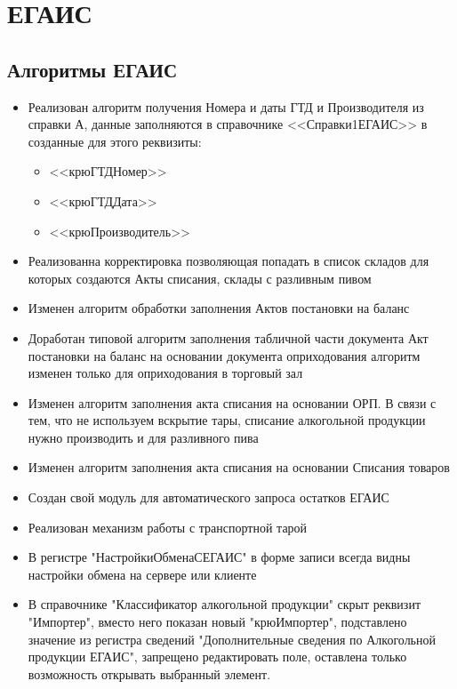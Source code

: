 \section{ЕГАИС}
\subsection{Алгоритмы ЕГАИС}


\begin{itemize}
	\item Реализован алгоритм получения Номера и даты ГТД и Производителя из справки А, данные заполняются в справочнике <<Справки1ЕГАИС>> в созданные для этого реквизиты:
    \begin{itemize}
        \item <<крюГТДНомер>>
        \item <<крюГТДДата>>
        \item <<крюПроизводитель>>
    \end{itemize}
	\item Реализованна корректировка позволяющая попадать в список складов для которых создаются Акты списания, склады с разливным пивом
	\item Изменен алгоритм обработки заполнения Актов постановки на баланс
	\item Доработан типовой алгоритм заполнения табличной части документа Акт постановки на баланс на 	основании документа оприходования алгоритм изменен только для оприходования в торговый зал
	\item Изменен алгоритм заполнения акта списания на основании ОРП. В связи с тем, что не используем вскрытие тары, списание алкогольной продукции  нужно производить и для разливного пива

	\item Изменен алгоритм заполнения акта списания на основании Списания товаров
	\item Создан свой модуль для автоматического запроса остатков ЕГАИС
	\item Реализован механизм работы с транспортной тарой
	\item В регистре "НастройкиОбменаСЕГАИС" в форме записи всегда видны настройки обмена на сервере или клиенте
	\item В справочнике "Классификатор алкогольной продукции" скрыт реквизит "Импортер", вместо него показан новый "крюИмпортер", подставлено значение из регистра сведений "Дополнительные сведения по Алкогольной продукции ЕГАИС", запрещено редактировать поле, оставлена только возможность открывать выбранный элемент.

\end{itemize}
\newpage
